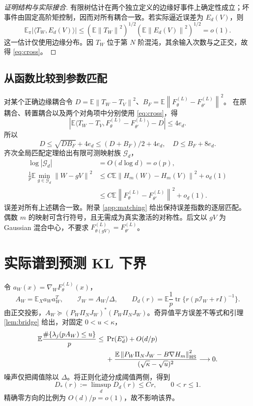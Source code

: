 \documentclass[a4paper]{tufte-handout}
\newcommand{\E}{\mathbb E}
\newcommand{\I}{\mathcal I}
\newcommand{\norm}[1]{\left\|#1\right\|}
\DeclareMathOperator{\tr}{tr}
\begin{document}
\begin{fullwidth}
\begin{proof}[证明结构与实际接合]
有限树估计在两个独立定义的边缘好事件上确定性成立；坏事件由固定高阶矩控制，因而对所有耦合一致。若实际逼近误差为 $E_d(V)$，则
\[
\E_\pi|\langle T_W,E_d(V)\rangle|
\le(\E\norm{T_W}^2)^{1/2}(\E\norm{E_d(V)}^2)^{1/2}=o(1).
\]
这一估计仅使用边缘分布。因 $T_W$ 位于第 $N$ 阶混沌，其余输入次数与之正交，故得 \eqref{eq:cross}。
\end{proof}

\subsection{从函数比较到参数匹配}
对某个正确边缘耦合令
$D=\E\norm{T_W-T_V}^2$、$B_F=\E\norm{F_\theta^{(L)}-F_{\theta'}^{(L)}}^2$。
在原耦合、转置耦合以及两个对角项中分别使用 \eqref{eq:cross}，得
\[
|\E\langle T_W-T_V,F_\theta^{(L)}-F_{\theta'}^{(L)}\rangle-D|\le4e_d.
\]
所以
\[
D\le\sqrt{DB_F}+4e_d\le(D+B_F)/2+4e_d,
\quad D\le B_F+8e_d.
\]
齐次全局匹配定理给出有限可测映射族 $\mathcal G_d$，
\begin{equation}\label{eq:matching}\begin{aligned}
\log|\mathcal G_d|&=O(d\log d)=o(p),\\
\frac1p\E\min_{g\in\mathcal G_d}\norm{W-gV}^2
&\le C\E\norm{H_m(W)-H_m(V)}^2+o_d(1)\\
&\le C\E\norm{F_\theta^{(L)}-F_{\theta'}^{(L)}}^2+o_d(1).
\end{aligned}\end{equation}
误差对所有上述耦合一致。附录 \ref{app:matching} 给出保持误差指数的逐层匹配。偶数 $m$ 的映射可含行符号，且无需成为真实激活的对称性。后文以 $gV$ 为 Gaussian 混合中心，不要求 $F_{\theta(gV)}^{(L)}=F_{\theta'}^{(L)}$。

\section{实际谱到预测 KL 下界}
令 $a_W(x)=\nabla_WF_\theta^{(L)}(x)$，
\[
A_W=\E_Xa_Wa_W^T,\qquad\I_W=A_W/\Delta,
\qquad D_d(r)=\E\frac1p\tr\{r(p\I_W+rI)^{-1}\}.
\]
由正交投影，$A_W\succeq(P_W\Pi_NJ_W)^*(P_W\Pi_NJ_W)$。奇异值平方误差不等式和引理 \ref{lem:bridge} 给出，对固定 $0<u<\kappa$，
\begin{equation}\begin{aligned}
\E\frac{\#\{\lambda_j(pA_W)\le u\}}p
\le{}&\Pr(E_d^c)+O(d/p)\\
&+\frac{\E\norm{P_W\Pi_NJ_W-B\nabla H_m}_{\rm HS}^2}
{(\sqrt\kappa-\sqrt u)^2}\longrightarrow0.
\end{aligned}\end{equation}
噪声仅把阈值除以 $\Delta$。将正则化迹分成阈值两侧，得到
\begin{equation}\label{eq:deficit}
D_*(r):=\limsup_dD_d(r)\le Cr,\qquad0<r\le1.
\end{equation}
精确零方向的比例为 $O(d)/p=o(1)$，故不影响该界。


\end{fullwidth}
\end{document}
